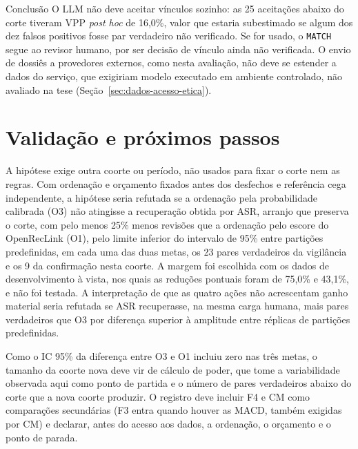 \begin{chapter}{Conclusão}
O LLM não deve aceitar vínculos sozinho: as 25 aceitações abaixo do corte tiveram VPP \textit{post hoc} de 16,0\%, valor que estaria subestimado se algum dos dez falsos positivos fosse par verdadeiro não verificado. Se for usado, o \texttt{MATCH} segue ao revisor humano, por ser decisão de vínculo ainda não verificada. O envio de dossiês a provedores externos, como nesta avaliação, não deve se estender a dados do serviço, que exigiriam modelo executado em ambiente controlado, não avaliado na tese (Seção~\ref{sec:dados-acesso-etica}).

\section{Validação e próximos passos}\label{sec:concl-trabalhos-futuros}

A hipótese exige outra coorte ou período, não usados para fixar o corte nem as regras. Com ordenação e orçamento fixados antes dos desfechos e referência cega independente, a hipótese seria refutada se a ordenação pela probabilidade calibrada (O3) não atingisse a recuperação obtida por ASR, arranjo que preserva o corte, com pelo menos 25\% menos revisões que a ordenação pelo escore do OpenRecLink (O1), pelo limite inferior do intervalo de 95\% entre partições predefinidas, em cada uma das duas metas, os 23 pares verdadeiros da vigilância e os 9 da confirmação nesta coorte. A margem foi escolhida com os dados de desenvolvimento à vista, nos quais as reduções pontuais foram de 75,0\% e 43,1\%, e não foi testada. A interpretação de que as quatro ações não acrescentam ganho material seria refutada se ASR recuperasse, na mesma carga humana, mais pares verdadeiros que O3 por diferença superior à amplitude entre réplicas de partições predefinidas.

Como o IC 95\% da diferença entre O3 e O1 incluiu zero nas três metas, o tamanho da coorte nova deve vir de cálculo de poder, que tome a variabilidade observada aqui como ponto de partida e o número de pares verdadeiros abaixo do corte que a nova coorte produzir. O registro deve incluir F4 e CM como comparações secundárias (F3 entra quando houver as MACD, também exigidas por CM) e declarar, antes do acesso aos dados, a ordenação, o orçamento e o ponto de parada.


\end{chapter}
